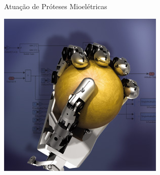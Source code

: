 \documentclass{beamer}
\begin{document}
\begin{frame}
\begin{columns}[c]
				\begin{figure}
					Atuação de Próteses Mioelétricas
					\begin{center}
						\includegraphics[width=\textwidth]{./img/prosthesis.jpg}
					\end{center}
				\end{figure}
		\end{columns}
	\end{frame}
\end{document}
